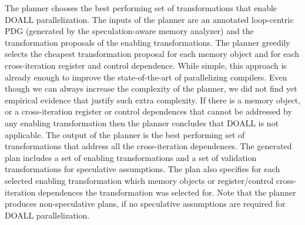 The planner chooses the best performing set of transformations that
enable DOALL parallelization.
%
The inputs of the planner are an annotated loop-centric PDG (generated
by the speculation-aware memory analyzer) and the transformation
proposals of the enabling transformations.
%
%
%
The planner greedily selects the cheapest transformation proposal for
each memory object and for each cross-iteration register and control
dependence.
%
%
While simple, this approach is already enough to improve the
state-of-the-art of parallelizing compilers. 
Even though we can always increase the complexity of the planner, we
did not find yet empirical evidence that justify such extra
complexity. 
%
If there is a memory object, or a cross-iteration register or control
dependences that cannot be addressed by any enabling transformation
then the planner concludes that DOALL is not applicable.
%
%
The output of the planner is the best performing
set of transformations that address all the cross-iteration
dependences. 
%
%
The generated plan includes a set of enabling transformations and a
set of validation transformations for speculative assumptions.  The
plan also specifies for each selected enabling transformation which
memory objects or register/control cross-iteration dependences the
transformation was selected for.
%
Note that the planner produces non-speculative plans, if no
speculative assumptions are required for DOALL parallelization.

